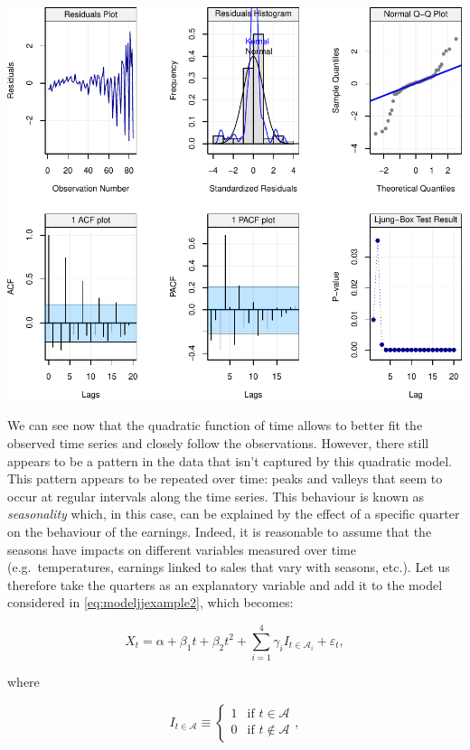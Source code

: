 \documentclass[]{book}
\theoremstyle{definition}
\theoremstyle{definition}
\theoremstyle{definition}
\theoremstyle{remark}
\begin{document}
\begin{center}\includegraphics{ts_files/figure-latex/lmresid2-1} \end{center}

We can see now that the quadratic function of time allows to better fit
the observed time series and closely follow the observations. However,
there still appears to be a pattern in the data that isn't captured by
this quadratic model. This pattern appears to be repeated over time:
peaks and valleys that seem to occur at regular intervals along the time
series. This behaviour is known as \emph{seasonality} which, in this
case, can be explained by the effect of a specific quarter on the
behaviour of the earnings. Indeed, it is reasonable to assume that the
seasons have impacts on different variables measured over time
(e.g.~temperatures, earnings linked to sales that vary with seasons,
etc.). Let us therefore take the quarters as an explanatory variable and
add it to the model considered in \eqref{eq:modeljjexample2}, which
becomes:

\begin{equation} 
X_t = \alpha + \beta_1 t + \beta_2 t^2 + \sum_{i = 1}^4 \gamma_i I_{t \in \mathcal{A}_i} + \varepsilon_t,
\label{eq:modeljjexample3}
\end{equation}

where

\begin{equation*}
  I_{t \in \mathcal{A}} \equiv \left\{
    \begin{array}{ll}
        1  & \mbox{if } t \in \mathcal{A} \\
        0 & \mbox{if } t \not\in \mathcal{A}
    \end{array}
\right. ,
\end{equation*}
\end{document}
